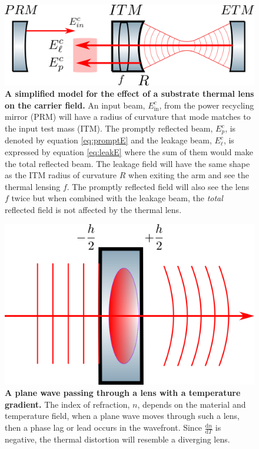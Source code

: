 \begin{figure}[ht]
{	}
	\label{fig:3d_HWS_plot}
\end{figure}

\begin{figure}[ht]
	\centering
	\includegraphics[width=.7 \textwidth]{../Figures/ThermalLensFP.png}
	\caption[A simplified model for the effect of a substrate thermal lens on the carrier field.]  
	{\textbf{A simplified model for the effect of a substrate thermal lens on the carrier field.} An input beam, $E_{\text{in}}^{c}$, from the power recycling mirror (PRM) will have a radius of curvature that mode matches to the input test mass (ITM).  The promptly reflected beam, $E_{p}^{c}$, is denoted by equation \ref{eq:promptE} and the leakage beam, $E_{\ell}^{c}$, is expressed by equation \ref{eq:leakE} where the sum of them would make the total reflected beam.  The leakage field will have the same shape as the ITM radius of curvature $R$ when exiting the arm and see the thermal lensing $f$. The promptly reflected field will also see the lens $f$ twice but when combined with the leakage beam, the \textit{total} reflected field is not affected by the thermal lens.}
	\label{fig:ThermalLensFP}
\end{figure}

\begin{figure}[ht]
	\centering
	\includegraphics[width=.4 \textwidth]{../Figures/ThermalLensWF.png}
	\caption[A plane wave passing through a lens with a temperature gradient.]  
	{\textbf{A plane wave passing through a lens with a temperature gradient.} The index of refraction, $n$, depends on the material and temperature field, when a plane wave moves through such a lens, then a phase lag or lead occurs in the wavefront. Since $\frac{\text{d}n}{\text{d}T}$ is negative, the thermal distortion will resemble a diverging lens.}
	\label{fig:ThermalLensWF}
\end{figure}

